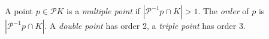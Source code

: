 A point $p \in \mathcal{P}K$ is a \textit{multiple point} if $|\mathcal{P}^{-1}p \cap K| > 1$. The \textit{order} of $p$ is $|\mathcal{P}^{-1}p \cap K|$. A \textit{double point} has order 2, a \textit{triple point} has order 3.
